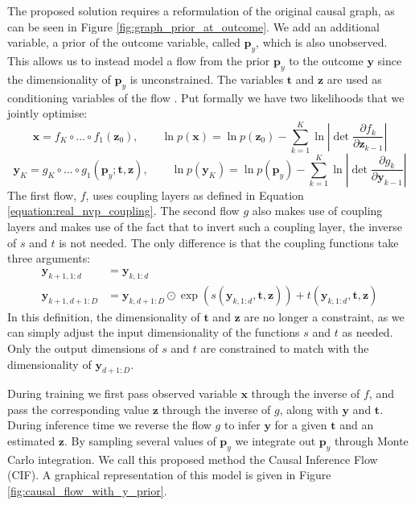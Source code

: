 \documentclass{report}
\newcommand{\py}{\mathbf{p}_y}
\newcommand{\bt}{\mathbf{t}}
\newcommand{\bx}{\mathbf{x}}
\newcommand{\by}{\mathbf{y}}
\newcommand{\bz}{\mathbf{z}}
\newcommand{\parfrac}[2]{\frac{\partial #1}{\partial#2}}
\begin{document}
The proposed solution requires a reformulation of the original causal graph, as can be seen in Figure \ref{fig:graph_prior_at_outcome}. We add an additional variable, a prior of the outcome variable, called $\py$, which is also unobserved. This allows us to instead model a flow from the prior $\py$ to the outcome $\by$ since the dimensionality of $\py$ is unconstrained. The variables $\bt$ and $\bz$ are used as conditioning variables of the flow \parencite{kingma2016improved, papamakarios2019normalizing, parafita2020causal}. Put formally we have two likelihoods that we jointly optimise:
\begin{equation}
    \bx = f_K \circ ... \circ f_1(\bz_0), \qquad \ln p(\bx) = \ln p(\bz_0) - \sum\limits^K_{k=1} \ln \left|\det \parfrac{f_k}{\bz_{k-1}}\right| 
\end{equation}
\begin{equation}
    \by_K = g_K \circ ... \circ g_1(\py; \bt, \bz), \qquad \ln p(\by_K) = \ln p(\py) - \sum\limits^K_{k=1} \ln \left|\det \parfrac{g_k}{\by_{k-1}}\right| 
\end{equation}
The first flow, $f$, uses coupling layers as defined in Equation \ref{equation:real_nvp_coupling}. The second flow $g$ also makes use of coupling layers and makes use of the fact that to invert such a coupling layer, the inverse of $s$ and $t$ is not needed. The only difference is that the coupling functions take three arguments:
\begin{align}
    \by_{k+1, 1:d} &= \by_{k, 1:d} \\
    \by_{k+1, d+1:D} &= \by_{k, d+1:D} \odot \exp \left(s(\by_{k, 1:d}, \bt, \bz) \right) + t(\by_{k, 1:d}, \bt, \bz)
\end{align}
In this definition, the dimensionality of $\bt$ and $\bz$ are no longer a constraint, as we can simply adjust the input dimensionality of the functions $s$ and $t$ as needed. Only the output dimensions of $s$ and $t$ are constrained to match with the dimensionality of $\by_{d+1:D}$.

During training we first pass observed variable $\bx$ through the inverse of $f$, and pass the corresponding value $\bz$ through the inverse of $g$, along with $\by$ and $\bt$. During inference time we reverse the flow $g$ to infer $\by$ for a given $\bt$ and an estimated $\bz$. By sampling several values of $\py$ we integrate out $\py$ through Monte Carlo integration. We call this proposed method the Causal Inference Flow (CIF). A graphical representation of this model is given in Figure \ref{fig:causal_flow_with_y_prior}.
\end{document}
